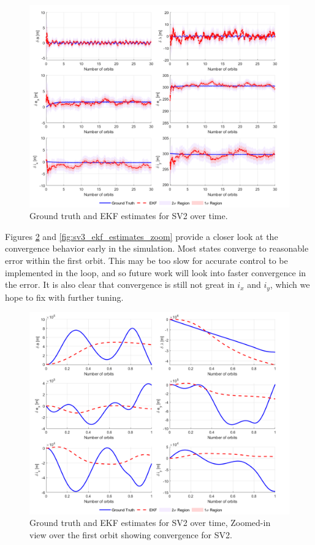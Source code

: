 \begin{figure}[H]
    \centering
    \includegraphics[width=0.8\linewidth]{sim/figures/PS8/ROE_over_time_SV2_comparison.png}
    \caption{Ground truth and EKF estimates for SV2 over time.}
    \label{fig:sv2_ekf_estimates}
\end{figure}

Figures \ref{fig:sv2_ekf_estimates_zoom} and \ref{fig:sv3_ekf_estimates_zoom} provide a closer look at the convergence behavior early in the simulation. Most states converge to reasonable error within the first orbit. This may be too slow for accurate control to be implemented in the loop, and so future work will look into faster convergence in the error. It is also clear that convergence is still not great in $i_x$ and $i_y$, which we hope to fix with further tuning.

\begin{figure}[H]
    \centering
    \includegraphics[width=0.8\linewidth]{sim/figures/PS8/ROE_over_time_SV2_comparison_zoomed.png}
    \caption{Ground truth and EKF estimates for SV2 over time, Zoomed-in view over the first orbit showing convergence for SV2.}
    \label{fig:sv2_ekf_estimates_zoom}
\end{figure}


